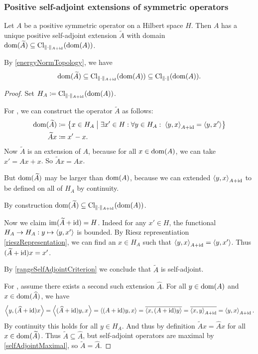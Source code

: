 \subsubsection{Positive self-adjoint extensions of symmetric operators}
\begin{theorem}
Let $A$ be a positive symmetric operator on a Hilbert space $H$. Then $A$ has a unique positive self-adjoint extension $\widetilde{A}$ with domain $\operatorname{dom}(\widetilde{A}) \subseteq \operatorname{Cl}_{\lVert\cdot\rVert_{A+\operatorname{id}}}(\operatorname{dom}(A))$.
\end{theorem}
By \ref{energyNormTopology}, we have
\[ \operatorname{dom}(\widetilde{A}) \subseteq \operatorname{Cl}_{\lVert\cdot\rVert_{A+\operatorname{id}}}(\operatorname{dom}(A)) \subseteq \operatorname{Cl}_{\lVert\cdot\rVert}(\operatorname{dom}(A)). \]
\begin{proof}
Set $H_A \coloneqq \operatorname{Cl}_{\lVert\cdot\rVert_{A+\operatorname{id}}}(\operatorname{dom}(A))$.

For , we can construct the operator $\widetilde{A}$ as follows:
\begin{align*}
\operatorname{dom}(\widetilde{A}) &\coloneqq \left\{ x\in H_A \;\middle|\; \exists x'\in H:\forall y\in H_A:\; \left\langle y,x \right\rangle_{A+\operatorname{id}} = \left\langle y,x' \right\rangle \right\} \\
\widetilde{A}x &\coloneqq x' - x.
\end{align*}
Now $\widetilde{A}$ is an extension of $A$, because for all $x\in \operatorname{dom}(A)$, we can take $x' = Ax + x$. So $\widetilde{A}x = Ax$.

But $\operatorname{dom}(\widetilde{A})$ may be larger than $\operatorname{dom}(A)$, because we can extended $\left\langle y,x \right\rangle_{A+\operatorname{id}}$ to be defined on all of $H_A$ by continuity.

By construction $\operatorname{dom}(\widetilde{A}) \subseteq \operatorname{Cl}_{\lVert\cdot\rVert_{A+\operatorname{id}}}(\operatorname{dom}(A))$.

Now we claim $\operatorname{im}(\widetilde{A} + \operatorname{id}) = H$. Indeed for any $x'\in H$, the functional $H_A \to H_A: y\mapsto \left\langle y,x' \right\rangle$ is bounded. By Riesz representiation \ref{rieszRepresentation}, we can find an $x\in H_A$ such that $\left\langle y,x \right\rangle_{A+\operatorname{id}} = \left\langle y,x' \right\rangle$. Thus $(\widetilde{A} + \operatorname{id})x = x'$.

By \ref{rangeSelfAdjointCriterion} we conclude that $\widetilde{A}$ is self-adjoint. 

For , assume there exists a second such extension $\widehat{A}$. For all $y\in \operatorname{dom}(A)$ and $x\in \operatorname{dom}(\widehat{A})$, we have
\[ \left\langle y, (\widehat{A}+\operatorname{id})x \right\rangle = \left\langle (\widehat{A}+\operatorname{id})y, x \right\rangle = \left\langle (A+\operatorname{id})y, x \right\rangle = \overline{\left\langle x, (A+\operatorname{id})y \right\rangle} = \overline{\left\langle x, y \right\rangle_{A+\operatorname{id}}} = \left\langle y, x \right\rangle_{A+\operatorname{id}}. \]
By continuity this holds for all $y\in H_A$. And thus by definition $\widetilde{A}x = \widehat{A}x$ for all $x\in\operatorname{dom}(\widetilde{A})$. Thus $\widetilde{A} \subseteq \widehat{A}$, but self-adjoint operators are maximal by \ref{selfAdjointMaximal}, so $\widetilde{A} = \widehat{A}$.
\end{proof}

